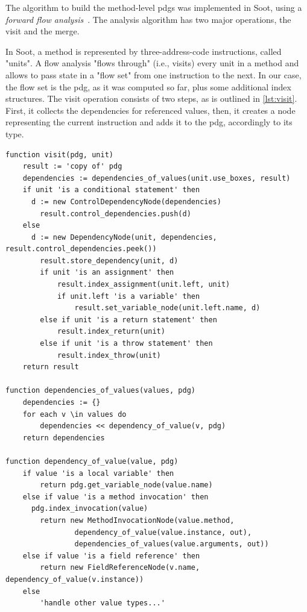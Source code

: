 The algorithm to build the method-level \acp{pdg} was implemented in Soot, using a \emph{forward flow analysis}~\cite{lam11:the_soot_framework}.
The analysis algorithm has two major operations, the visit and the merge.

In Soot, a method is represented by three-address-code instructions, called "units".
A flow analysis "flows through" (i.e., visits) every unit in a method and allows to pass state in a "flow set" from one instruction to the next.
In our case, the flow set is the \ac{pdg}, as it was computed so far, plus some additional index structures.
The visit operation consists of two steps, as is outlined in \cref{lst:visit}.
First, it collects the dependencies for referenced values, 
then, it creates a node representing the current instruction and adds it to the \ac{pdg}, accordingly to its type.

\begin{lstlisting}[firstnumber=1,float,caption={The algorithm of the visit operation.},stepnumber=5,label=lst:visit,gobble=0,language=algorithm,tabsize=2]
function visit(pdg, unit)
	result := 'copy of' pdg
	dependencies := dependencies_of_values(unit.use_boxes, result)
	if unit 'is a conditional statement' then
	  d := new ControlDependencyNode(dependencies)
		result.control_dependencies.push(d)
	else
	  d := new DependencyNode(unit, dependencies, result.control_dependencies.peek())
		result.store_dependency(unit, d)
		if unit 'is an assignment' then
			result.index_assignment(unit.left, unit)
			if unit.left 'is a variable' then
				result.set_variable_node(unit.left.name, d)
		else if unit 'is a return statement' then
			result.index_return(unit)
		else if unit 'is a throw statement' then
			result.index_throw(unit)
	return result

function dependencies_of_values(values, pdg)
	dependencies := {}
	for each v \in values do
		dependencies << dependency_of_value(v, pdg)
	return dependencies

function dependency_of_value(value, pdg)
	if value 'is a local variable' then
		return pdg.get_variable_node(value.name)
	else if value 'is a method invocation' then
	  pdg.index_invocation(value)
		return new MethodInvocationNode(value.method, 
				dependency_of_value(value.instance, out), 
				dependencies_of_values(value.arguments, out))
	else if value 'is a field reference' then
		return new FieldReferenceNode(v.name, dependency_of_value(v.instance))
	else 
		'handle other value types...'
\end{lstlisting}

